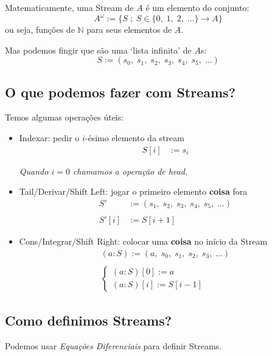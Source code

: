 \documentclass{article}
\newcommand{\head}{\emph{head}}
\newcommand{\coisa}[1]{\textbf{coisa#1}}
\begin{document}
Matematicamente,
uma Stream de \(A\) é um elemento do conjunto:
\[
    A^\omega := \{
        S \;;\;
        S \in \{ 0, \; 1, \; 2, \; \dots \} \to A
    \}
\]
ou seja, funções de \(\mathbb{N}\)
para seus elementos de \(A\).

Mas podemos fingir que são uma `lista infinita' de \(A\)s:
\[
    S := (s_0, \; s_1, \; s_2, \; s_3, \; s_4, \; s_5, \; \dots)
\]

\subsection{O que podemos fazer com Streams?}

Temos algumas operações úteis:
\begin{itemize}
    \item Indexar:
        pedir o \(i\)-ésimo elemento da stream
    \begin{align*}
        S[i] &:= s_i
    \end{align*}

    \emph{Quando \(i = 0\) chamamos a operação de \head{}.}
    \item Tail/Derivar/Shift Left:
        jogar o primeiro elemento \coisa{} fora
    \begin{align*}
        S' &:= (s_1, \; s_2, \; s_3, \; s_4, \; s_5, \; \dots)
        \\ \\
        S'[i] &:= S[i+1]
    \end{align*}

    \item Cons/Integrar/Shift Right:
        colocar uma \coisa{} no início da Stream
    \begin{align*}
        (a : S) := (a, \; s_0, \; s_1, \; s_2, \; s_3, \; \dots)
        \\ \\
        \begin{cases}
            (a : S)[0] := a \\
            (a : S)[i] := S[i-1]
        \end{cases}
    \end{align*}
\end{itemize}

\subsection{Como definimos Streams?}

Podemos usar \emph{Equações Diferenciais}
para definir Streams.
\end{document}
